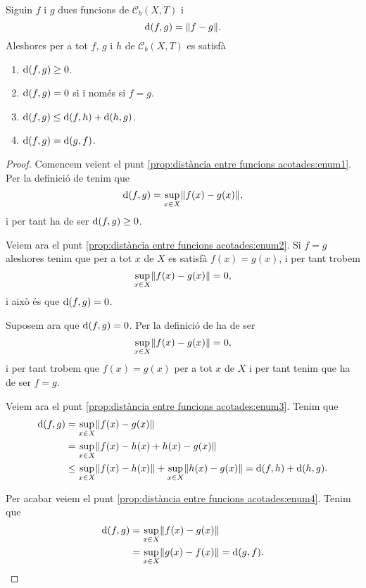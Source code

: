 \documentclass[../Apunts.tex]{subfiles}
\begin{document}
	\begin{proposition}
		\label{prop:distància entre funcions acotades}
		Siguin \(f\) i \(g\) dues funcions de \(\mathcal{C}_{b}(X,T)\) i
		\[\distancia(f,g)=\norm{f-g}.\]
		Aleshores per a tot \(f\), \(g\) i \(h\) de \(\mathcal{C}_{b}(X,T)\) es satisfà
		\begin{enumerate}
			\item\label{prop:distància entre funcions acotades:enum1} \(\operatorname{d}(f,g)\geq0\).
			\item\label{prop:distància entre funcions acotades:enum2} \(\operatorname{d}(f,g)=0\) si i només si \(f=g\).
			\item\label{prop:distància entre funcions acotades:enum3} \(\operatorname{d}(f,g)\leq\operatorname{d}(f,h)+\operatorname{d}(h,g)\).
			\item\label{prop:distància entre funcions acotades:enum4} \(\operatorname{d}(f,g)=\operatorname{d}(g,f)\).
		\end{enumerate}
		\begin{proof}
			Comencem veient el punt \eqref{prop:distància entre funcions acotades:enum1}. Per la definició de  tenim que
			\[\distancia(f,g)=\sup_{x\in X}\norm{f(x)-g(x)},\]
			i per tant ha de ser \(\operatorname{d}(f,g)\geq0\).
			
			Veiem ara el punt \eqref{prop:distància entre funcions acotades:enum2}. Si \(f=g\) aleshores tenim que per a tot \(x\) de \(X\) es satisfà \(f(x)=g(x)\), i per tant trobem
			\[\sup_{x\in X}\norm{f(x)-g(x)}=0,\]
			i això és que \(\operatorname{d}(f,g)=0\).
			
			Suposem ara que \(\operatorname{d}(f,g)=0\). Per la definició de  ha de ser
			\[\sup_{x\in X}\norm{f(x)-g(x)}=0,\]
			i per tant trobem que \(f(x)=g(x)\) per a tot \(x\) de \(X\) i per tant tenim que ha de ser \(f=g\).
			
			Veiem ara el punt \eqref{prop:distància entre funcions acotades:enum3}. Tenim que
			\begin{align*}
				\distancia(f,g)&=\sup_{x\in X}\norm{f(x)-g(x)} \\
				&=\sup_{x\in X}\norm{f(x)-h(x)+h(x)-g(x)} \\
				&\leq\sup_{x\in X}\norm{f(x)-h(x)}+\sup_{x\in X}\norm{h(x)-g(x)}=\distancia(f,h)+\distancia(h,g).
			\end{align*}
			
			Per acabar veiem el punt \eqref{prop:distància entre funcions acotades:enum4}. Tenim que
			\begin{align*}
				\distancia(f,g)&=\sup_{x\in X}\norm{f(x)-g(x)} \\
				&=\sup_{x\in X}\norm{g(x)-f(x)}=\distancia(g,f).\qedhere
			\end{align*}
		\end{proof}
	\end{proposition}
\end{document}
